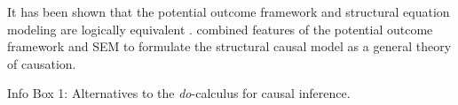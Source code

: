\documentclass[nobib]{tufte-handout}
\newcommand{\docalc}{\emph{do}-calculus\xspace}
\begin{document}
\begin{InfoBox}
{\begin{minipage}{1\textwidth}
    It has been shown that the potential outcome framework and structural equation modeling are logically equivalent \citep{galles1998axiomatic, halpern2000axiomatizing}.
    \citet{pearl2000models} combined features of the potential outcome framework and SEM to formulate the structural causal model as a general theory of causation.

    \medskip


  \end{minipage}
}
\begin{center}
Info Box 1: Alternatives to the \docalc for causal inference.
\end{center}
\end{InfoBox}



\printbibliography[heading=bibintoc]
\end{document}
